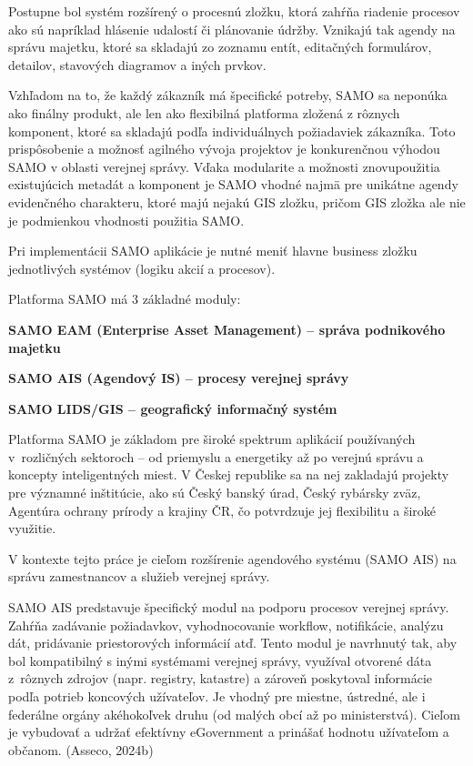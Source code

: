 Postupne bol systém rozšírený o procesnú zložku, ktorá zahŕňa riadenie procesov ako sú napríklad hlásenie udalostí či plánovanie údržby. Vznikajú tak agendy na správu majetku, ktoré sa skladajú zo zoznamu entít, editačných formulárov, detailov, stavových diagramov a iných prvkov. 

Vzhľadom na to, že každý zákazník má špecifické potreby, SAMO sa neponúka ako finálny produkt, ale len ako flexibilná platforma zložená z rôznych komponent, ktoré sa skladajú podľa individuálnych požiadaviek zákazníka. Toto prispôsobenie a možnosť agilného vývoja projektov je konkurenčnou výhodou SAMO v oblasti verejnej správy. Vďaka modularite a možnosti znovupoužitia existujúcich metadát a komponent je SAMO vhodné najmä pre unikátne agendy evidenčného charakteru, ktoré majú nejakú GIS zložku, pričom GIS zložka ale nie je podmienkou vhodnosti použitia SAMO. 

Pri implementácii SAMO aplikácie je nutné meniť hlavne business zložku jednotlivých systémov (logiku akcií a procesov).

\blank
Platforma SAMO má 3 základné moduly:

\startitemize
\item \start\bf SAMO EAM \stop (Enterprise Asset Management) --  správa podnikového majetku
\item \start\bf SAMO AIS \stop (Agendový IS) -- procesy verejnej správy
\item  \start\bf SAMO LIDS/GIS \stop -- geografický informačný systém
\stopitemize

Platforma SAMO je základom pre široké spektrum aplikácií používaných v~rozličných sektoroch – od priemyslu a energetiky až po verejnú správu a koncepty inteligentných miest. V Českej republike sa na nej zakladajú projekty pre významné inštitúcie, ako sú Český banský úrad, Český rybársky zväz, Agentúra ochrany prírody a krajiny ČR, čo potvrdzuje jej flexibilitu a široké využitie.


V kontexte tejto práce je cieľom rozšírenie agendového systému (SAMO AIS) na správu zamestnancov a služieb verejnej správy.

SAMO AIS predstavuje špecifický modul na podporu procesov verejnej sprá\-vy. Zahŕňa zadávanie požiadavkov, vyhodnocovanie workflow, notifikácie, analýzu dát, pridávanie priestorových informácií atď. Tento modul je navrhnutý tak, aby bol kompatibilný s inými systémami verejnej správy, využíval otvorené dáta z~rôznych zdrojov (napr. registry, katastre) a zároveň poskytoval informácie podľa potrieb koncových užívateľov. Je vhodný pre miestne, ústredné, ale i federálne orgány akéhokoľvek druhu (od malých obcí až po ministerstvá). Cieľom je vybudovať a udržať efektívny eGovernment a prinášať hodnotu užívateľom a občanom. \scr(Asseco, 2024b)

